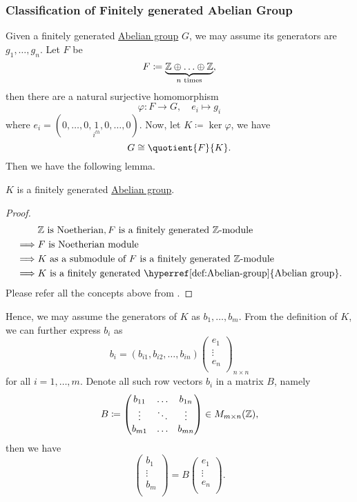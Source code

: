 \subsubsection{Classification of Finitely generated Abelian Group}
Given a finitely generated \hyperref[def:Abelian-group]{Abelian group} \(G\), we may assume its generators are \(g_1, \ldots , g_n \). Let \(F\) be
\[
	F\coloneqq \underbrace{\mathbb{\MakeUppercase{z}} \oplus \ldots \oplus \mathbb{\MakeUppercase{z}}  }_{n \text{ times}},
\]
then there are a natural surjective homomorphism
\[
	\varphi \colon F\to G,\quad e_{i} \mapsto g_{i}
\]
where \(e_{i} = (0, \ldots , 0, \underset{i^{th} }{1}, 0, \ldots , 0  )\). Now, let \(K\coloneqq \ker \varphi  \), we have
\[
	G \cong \quotient{F}{K}.
\]
Then we have the following lemma.
\begin{lemma}
	\(K\) is a finitely generated \hyperref[def:Abelian-group]{Abelian group}.
\end{lemma}
\begin{proof}
	\[
		\begin{split}
			&\mathbb{\MakeUppercase{z}} \text{ is Noetherian}, F \text{ is a finitely generated \(\mathbb{Z}\)-module }  \\
			\implies &F \text{ is Noetherian module}\\
			\implies &\text{\(K\) as a submodule of \(F\) is a finitely generated \(\mathbb{Z}\)-module } \\
			\implies &\text{\(K\) is a finitely generated \hyperref[def:Abelian-group]{Abelian group}}.
		\end{split}
	\]
	Please refer all the concepts above from \cite{atiyah1994introduction}.
\end{proof}

Hence, we may assume the generators of \(K\) as \(b_1, \ldots , b_{m}\). From the definition of \(K\), we can further express \(b_{i}\) as
\[
	b_{i} = (b_{i1}, b_{i2}, \ldots , b_{in})\begin{pmatrix}
		e_{1}  \\
		\vdots \\
		e_{n}  \\
	\end{pmatrix}_{n \times n}
\]
for all \(i = 1, \ldots , m \). Denote all such row vectors \(b_{i} \) in a matrix \(B\), namely
\[
	B \coloneqq \begin{pmatrix}
		b_{11} & \ldots & b_{1n} \\
		\vdots & \ddots & \vdots \\
		b_{m1} & \ldots & b_{mn} \\
	\end{pmatrix}\in M_{m\times n} ({\mathbb{\MakeUppercase{z}} }),
\]
then we have
\[
	\begin{pmatrix}
		b_1    \\
		\vdots \\
		b_m    \\
	\end{pmatrix} = B\begin{pmatrix}
		e_{1}  \\
		\vdots \\
		e_{n}  \\
	\end{pmatrix}.
\]

